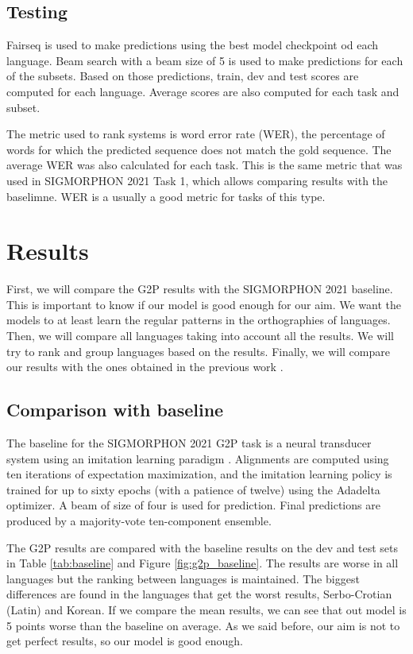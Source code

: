 \documentclass[11pt,a4paper]{article}
\begin{document}
\subsection{Testing}

Fairseq is used to make predictions using the best model checkpoint od each language. Beam search with a beam size of 5 is used to make predictions for each of the subsets. Based on those predictions, train, dev and test scores are computed for each language. Average scores are also computed for each task and subset.

The metric used to rank systems is word error rate (WER), the percentage of words for which the predicted sequence does not match the gold sequence. The average WER was also calculated for each task. This is the same metric that was used in SIGMORPHON 2021 Task 1, which allows comparing results with the baselimne. WER is a usually a good metric for tasks of this type.

\section{Results}

First, we will compare the G2P results with the SIGMORPHON 2021 baseline. This is important to know if our model is good enough for our aim. We want the models to at least learn the regular patterns in the orthographies of languages. Then, we will compare all languages taking into account all the results. We will try to rank and group languages based on the results. Finally, we will compare our results with the ones obtained in the previous work \citet{marjou2021oteann}.

\subsection{Comparison with baseline}

The baseline for the SIGMORPHON 2021 G2P task is a neural transducer system using an imitation learning paradigm \cite{makarov-clematide-2018-imitation}. Alignments are computed using ten iterations of expectation maximization, and the imitation learning policy is trained for up to sixty epochs (with a patience of twelve) using the Adadelta optimizer. A beam of size of four is used for prediction. Final predictions are produced by a majority-vote ten-component ensemble.

The G2P results are compared with the baseline results on the dev and test sets in Table \ref{tab:baseline} and Figure \ref{fig:g2p_baseline}. The results are worse in all languages but the ranking between languages is maintained. The biggest differences are found in the languages that get the worst results, Serbo-Crotian (Latin) and Korean. If we compare the mean results, we can see that out model is 5 points worse than the baseline on average. As we said before, our aim is not to get perfect results, so our model is good enough.
\end{document}
